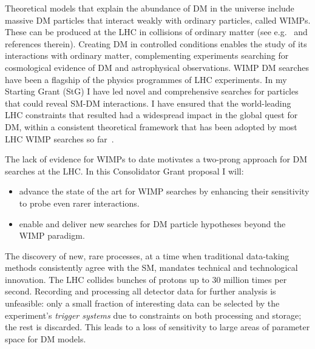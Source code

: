 \documentclass[11pt,a4paper]{article}
\begin{document}
Theoretical models that explain the abundance of DM in the universe include massive DM particles that interact weakly with ordinary particles, called WIMPs. These can be produced at the LHC in collisions of ordinary matter (see e.g.~\cite{Boveia:2018yeb} and references therein). 
Creating DM in controlled conditions enables the study of its interactions with ordinary matter, complementing experiments searching for cosmological evidence of DM and astrophysical observations. %
WIMP DM searches have been a flagship of the physics programmes of LHC experiments. In my Starting Grant (StG) I have led novel and comprehensive searches for particles that could reveal SM-DM interactions. I have ensured that the world-leading LHC constraints that resulted had a widespread impact in the global quest for DM, within a consistent theoretical framework that has been adopted by most LHC WIMP searches so far~\cite{Abercrombie:2015wmb}.  

The lack of evidence for WIMPs to date motivates a two-prong approach for DM searches at the LHC. In this Consolidator Grant proposal I will:
\begin{itemize}
    \item advance the state of the art for WIMP searches by enhancing their sensitivity to probe even rarer interactions.%
    \item enable and deliver new searches for DM particle hypotheses beyond the WIMP paradigm. 
\end{itemize}

The discovery of new, rare processes, at a time when traditional data-taking methods consistently agree with the SM, mandates technical and technological innovation. The LHC collides bunches of protons up to 30 million times per second. Recording and processing all detector data for further analysis is unfeasible: only a small fraction of interesting data can be selected by the experiment’s \textit{trigger systems} due to constraints on both processing and storage; the rest is discarded. This leads to a loss of sensitivity to large areas of parameter space for DM models. 
\end{document}

